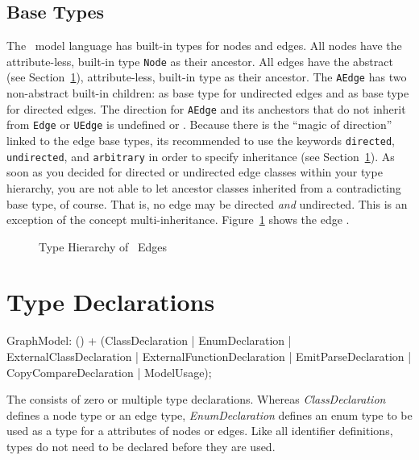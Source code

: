 \subsection{Base Types}
\label{sct:basetypes}
The \GrG\ model language has built-in types for nodes and edges.
All nodes have the attribute-less, built-in type \texttt{Node} as their ancestor.
All edges have the abstract (see Section~\ref{typedecl}), attribute-less, built-in type \texttt{} as their ancestor.
The \texttt{AEdge} has two non-abstract built-in children: \texttt{} as base type for undirected edges and \texttt{} as base type for directed edges.
The direction for \texttt{AEdge} and its anchestors that do not inherit from \texttt{Edge} or \texttt{UEdge} is undefined or .
Because there is the ``magic of direction'' linked to the edge base types, its recommended to use the keywords \texttt{directed}, \texttt{undirected}, and \texttt{arbitrary} in order to specify inheritance (see Section~\ref{typedecl}).
As soon as you decided for directed or undirected edge classes within your type hierarchy, you are not able to let ancestor classes inherited from a contradicting base type, of course.
That is, no edge may be directed \emph{and} undirected.
This is an exception of the concept multi-inheritance.
Figure~\ref{fig:basetypes} shows the edge .
\begin{figure}[htbp]
	\centering
	
	\caption{Type Hierarchy of \GrG\ Edges}
	\label{fig:basetypes}
\end{figure}


\section{Type Declarations}
\label{typedecl}

\begin{rail}
  GraphModel: () + (ClassDeclaration
  									 | EnumDeclaration
  									 | ExternalClassDeclaration
  									 | ExternalFunctionDeclaration
  									 | EmitParseDeclaration
  									 | CopyCompareDeclaration
  									 | ModelUsage);
\end{rail}
The  consists of zero or multiple type declarations.
Whereas \emph{ClassDeclaration} defines a node type or an edge type, \emph{EnumDeclaration} defines an enum type to be used as a type for a attributes of nodes or edges.
Like all identifier definitions, types do not need to be declared before they are used.

